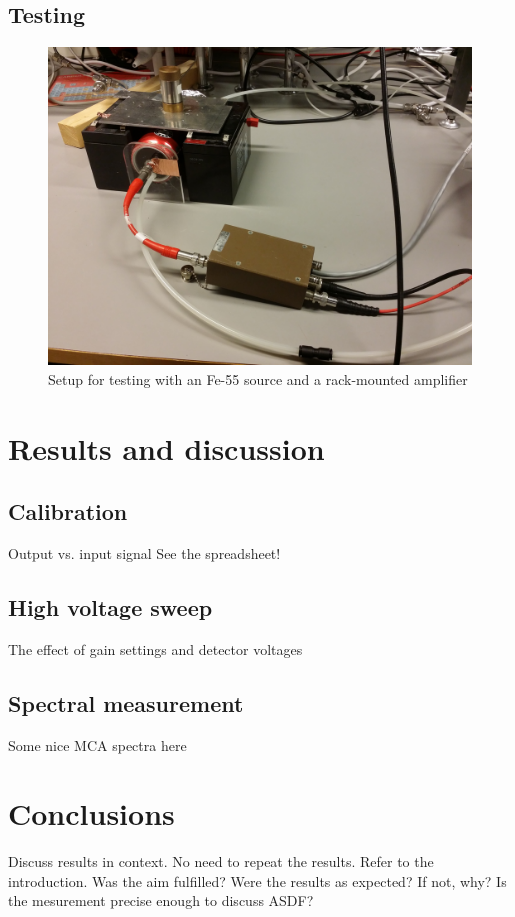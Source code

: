 \documentclass[a4paper]{article}
\begin{document}
\FloatBarrier
\subsection{Testing}

\begin{figure}[ht!]
\centering
\includegraphics[width=\textwidth]{fig/IMG_20201130_144418.jpg}
\caption{Setup for testing with an Fe-55 source and a rack-mounted amplifier}
\end{figure}


\FloatBarrier
\section{Results and discussion}


\subsection{Calibration}
Output vs. input signal
See the spreadsheet!

\subsection{High voltage sweep}
The effect of gain settings and detector voltages

\subsection{Spectral measurement}
Some nice MCA spectra here


\section{Conclusions}
Discuss results in context.
No need to repeat the results.
Refer to the introduction.
Was the aim fulfilled?
Were the results as expected? If not, why?
Is the mesurement precise enough to discuss ASDF?
\end{document}

